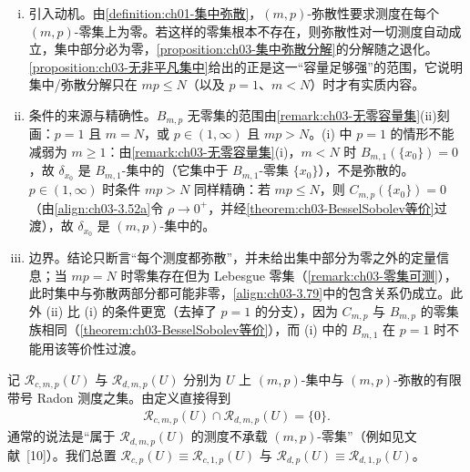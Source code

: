 \documentclass[../../main.tex]{subfiles}%
\begin{document}
\begin{remark}\label{remark:ch03-mp弥散动机}
\begin{enumerate}[(i)]
\item 引入动机。由\cref{definition:ch01-集中弥散}，$(m,p)$-弥散性要求测度在每个 $(m,p)$-零集上为零。若这样的零集根本不存在，则弥散性对一切测度自动成立，集中部分必为零，\cref{proposition:ch03-集中弥散分解}的分解随之退化。\cref{proposition:ch03-无非平凡集中}给出的正是这一“容量足够强”的范围，它说明集中/弥散分解只在 $mp\leqslant N$（以及 $p=1$、$m<N$）时才有实质内容。
\item 条件的来源与精确性。$B_{m,p}$ 无零集的范围由\cref{remark:ch03-无零容量集}(ii)刻画：$p=1$ 且 $m=N$，或 $p\in(1,\infty)$ 且 $mp>N$。(i) 中 $p=1$ 的情形不能减弱为 $m\geqslant1$：由\cref{remark:ch03-无零容量集}(i)，$m<N$ 时 $B_{m,1}(\{x_0\})=0$，故 $\delta_{x_0}$ 是 $B_{m,1}$-集中的（它集中于 $B_{m,1}$-零集 $\{x_0\}$），不是弥散的。$p\in(1,\infty)$ 时条件 $mp>N$ 同样精确：若 $mp\leqslant N$，则 $C_{m,p}(\{x_0\})=0$（由\eqref{align:ch03-3.52a}令 $\rho\to0^+$，并经\cref{theorem:ch03-BesselSobolev等价}过渡），故 $\delta_{x_0}$ 是 $(m,p)$-集中的。
\item 边界。结论只断言“每个测度都弥散”，并未给出集中部分为零之外的定量信息；当 $mp=N$ 时零集存在但为 Lebesgue 零集（\cref{remark:ch03-零集可测}），此时集中与弥散两部分都可能非零，\eqref{align:ch03-3.79}中的包含关系仍成立。此外 (ii) 比 (i) 的条件更宽（去掉了 $p=1$ 的分支），因为 $C_{m,p}$ 与 $B_{m,p}$ 的零集族相同（\cref{theorem:ch03-BesselSobolev等价}），而 (i) 中的 $B_{m,1}$ 在 $p=1$ 时不能用该等价性过渡。
\end{enumerate}
\end{remark}

记 $\mathscr{R}_{c,m,p}(U)$ 与 $\mathscr{R}_{d,m,p}(U)$ 分别为 $U$ 上 $(m,p)$-集中与 $(m,p)$-弥散的有限带号 Radon 测度之集。由定义直接得到
\begin{align*}
\mathscr{R}_{c,m,p}(U)\cap\mathscr{R}_{d,m,p}(U)=\{0\}.
\end{align*}
通常的说法是“属于 $\mathscr{R}_{d,m,p}(U)$ 的测度不承载 $(m,p)$-零集”（例如见文献~[10]）。我们总置 $\mathscr{R}_{c,p}(U)\equiv\mathscr{R}_{c,1,p}(U)$ 与 $\mathscr{R}_{d,p}(U)\equiv\mathscr{R}_{d,1,p}(U)$。
\end{document}
